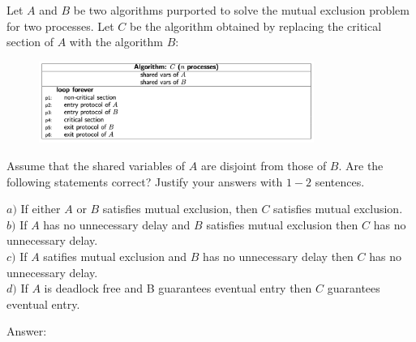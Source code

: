 \documentclass{article}
\begin{document}
\clearpage
\begin{Question} 
Let $A$ and $B$ be two algorithms purported to solve the mutual exclusion problem for two processes. Let $C$ be the algorithm obtained by replacing the critical section of $A$ with the algorithm $B$:

\begin{figure}[H]
    \centering 
    \includegraphics[width=0.8\textwidth]{DV_demand2}
\end{figure}
Assume that the shared variables of $A$ are disjoint from those of $B$. Are the following statements correct? Justify your answers with $1-2$ sentences.

$a)$ If either $A$ or $B$ satisfies mutual exclusion, then $C$ satisfies mutual exclusion.\\
$b)$ If $A$ has no unnecessary delay and $B$ satisfies mutual exclusion then $C$ has no unnecessary delay.\\
$c)$ If $A$ satifies mutual exclusion and $B$ has no unnecessary delay then $C$ has no unnecessary delay.\\
$d)$ If $A$ is deadlock free and B guarantees eventual entry then $C$ guarantees eventual entry.\\

\begin{answer}
Answer: \\
\begin{quote}
    
\end{quote}
\end{answer}
\end{Question}
    
\end{document}
